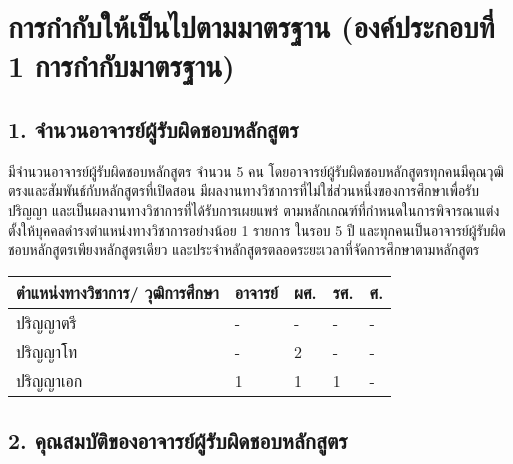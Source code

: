 \cleardoublepage
\section{การกำกับให้เป็นไปตามมาตรฐาน (องค์ประกอบที่ 1 การกำกับมาตรฐาน)}

\subsection*{1. จำนวนอาจารย์ผู้รับผิดชอบหลักสูตร}

\printprogram{} มีจำนวนอาจารย์ผู้รับผิดชอบหลักสูตร จำนวน 5 คน โดยอาจารย์ผู้รับผิดชอบหลักสูตรทุกคนมีคุณวุฒิตรงและสัมพันธ์กับหลักสูตรที่เปิดสอน มีผลงานทางวิชาการที่ไม่ใช่ส่วนหนึ่งของการศึกษาเพื่อรับปริญญา และเป็นผลงานทางวิชาการที่ได้รับการเผยแพร่ ตามหลักเกณฑ์ที่กำหนดในการพิจารณาแต่งตั้งให้บุคคลดำรงตำแหน่งทางวิชาการอย่างน้อย 1 รายการ ในรอบ 5 ปี และทุกคนเป็นอาจารย์ผู้รับผิดชอบหลักสูตรเพียงหลักสูตรเดียว และประจำหลักสูตรตลอดระยะเวลาที่จัดการศึกษาตามหลักสูตร

\begin{center}
\begin{tabular}{|P{0.4\textwidth}|P{0.1\textwidth}|P{0.1\textwidth}|P{0.1\textwidth}|P{0.1\textwidth}|}
\hline
ตำแหน่งทางวิชาการ/ วุฒิการศึกษา & อาจารย์ & ผศ. & รศ. & ศ. \\ \hline
ปริญญาตรี & - & - & - & - \\ \hline
ปริญญาโท  & - & 2 & - & - \\ \hline
ปริญญาเอก & 1 & 1 & 1 & - \\ \hline
\end{tabular}
\end{center}

\printselfeval   %

\subsection*{2. คุณสมบัติของอาจารย์ผู้รับผิดชอบหลักสูตร}

